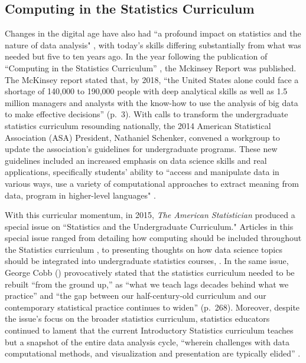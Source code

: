\documentclass[12pt]{article}
\begin{document}
\subsection{Computing in the Statistics Curriculum}

\quad Changes in the digital age have also had ``a profound impact on statistics
and the nature of data analysis" \citep[p.\ 97]{nolan}, with today's skills 
differing substantially from what was needed but five to ten years ago. 
In the year following the publication of ``Computing in the Statistics 
Curriculum'' \citep{nolan}, the Mckinsey Report \citep{mckinsey} was published. 
The McKinsey report stated that, by 2018, ``the United States alone could face a
shortage of 140,000 to 190,000 people with deep analytical skills as well as 1.5
million managers and analysts with the know-how to use the analysis of big data
to make effective decisions'' (p.\ 3). With calls to transform the undergraduate
statistics curriculum resounding nationally, the 2014 American Statistical 
Association (ASA) President, Nathaniel Schenker, convened a workgroup to update
the association's guidelines for undergraduate programs. These new guidelines 
included an increased emphasis on data science skills and real applications, 
specifically students' ability to ``access and manipulate data in various ways,
use a variety of computational approaches to extract meaning from data, program
in higher-level languages" \citep[p.\ 7]{asa}. 

\quad With this curricular momentum, in 2015, \emph{The American Statistician} 
produced a special issue on ``Statistics and the Undergraduate Curriculum." Articles 
in this special issue ranged from detailing how computing should be included 
throughout the Statistics curriculum \citep{jenny, tintle, hesterberg}, to 
presenting thoughts on how data science topics should be integrated into 
undergraduate statistics courses, \citep{esr, grimshaw, 
baumer_datascience, hardin}. In the same issue, George Cobb (\citeyear{cobb}) 
provocatively stated that the statistics curriculum needed to be rebuilt ``from
the ground up,'' as ``what we teach lags decades behind what we practice'' and 
``the gap between our half-century-old curriculum and our contemporary 
statistical practice continues to widen'' (p.\ 268). Moreover, despite the 
issue's focus on the broader statistics curriculum, statistics educators
continued to lament that the current Introductory Statistics curriculum teaches
but a snapshot of the entire data analysis cycle, ``wherein challenges with data
computational methods, and visualization and presentation are typically elided'' 
\citep[p.\ 336]{baumer_datascience}. 
\end{document}

